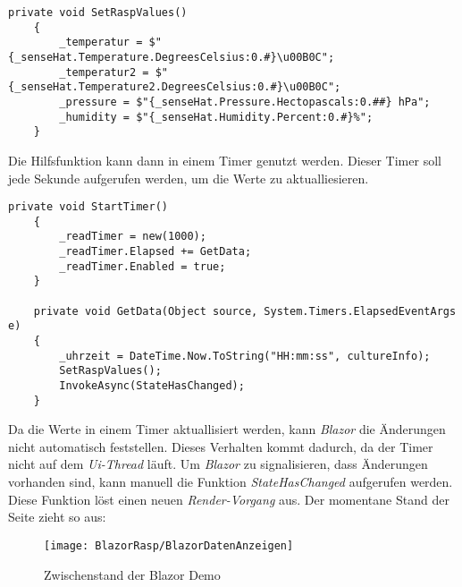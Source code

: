 \begin{lstlisting}[language={[Sharp]C}, caption=Funktion: SetRaspValues,
    label=lst:SetRaspValues]
    private void SetRaspValues()
    {
        _temperatur = $"{_senseHat.Temperature.DegreesCelsius:0.#}\u00B0C";
        _temperatur2 = $"{_senseHat.Temperature2.DegreesCelsius:0.#}\u00B0C";
        _pressure = $"{_senseHat.Pressure.Hectopascals:0.##} hPa";
        _humidity = $"{_senseHat.Humidity.Percent:0.#}%";
    }
\end{lstlisting}

Die Hilfsfunktion kann dann in einem Timer genutzt werden. Dieser Timer soll jede Sekunde
aufgerufen werden, um die Werte zu aktualliesieren.

\begin{lstlisting}[language={[Sharp]C}, caption=Timer: ReadTimer,
    label=lst:ReadTimer]
    private void StartTimer()
    {
        _readTimer = new(1000);
        _readTimer.Elapsed += GetData;
        _readTimer.Enabled = true;
    }

    private void GetData(Object source, System.Timers.ElapsedEventArgs e)
    {
        _uhrzeit = DateTime.Now.ToString("HH:mm:ss", cultureInfo);
        SetRaspValues();
        InvokeAsync(StateHasChanged);
    }
\end{lstlisting}

Da die Werte in einem Timer aktuallisiert werden, kann \emph{Blazor} die Änderungen nicht
automatisch feststellen. Dieses Verhalten kommt dadurch, da der Timer nicht auf dem
\emph{Ui-Thread} läuft. Um \emph{Blazor} zu signalisieren, dass Änderungen
vorhanden sind, kann manuell die Funktion \emph{StateHasChanged} aufgerufen werden. Diese
Funktion löst einen neuen \emph{Render-Vorgang} aus.
\newline
\newline
Der momentane Stand der Seite zieht so aus:

\begin{figure}[h]
    \centering
    \texttt{[image: BlazorRasp/BlazorDatenAnzeigen]}
    \caption[Zwischenstand der Blazor Demo]{Zwischenstand der Blazor Demo}
    \label{img:BlazorDatenAnzeigen}
\end{figure}